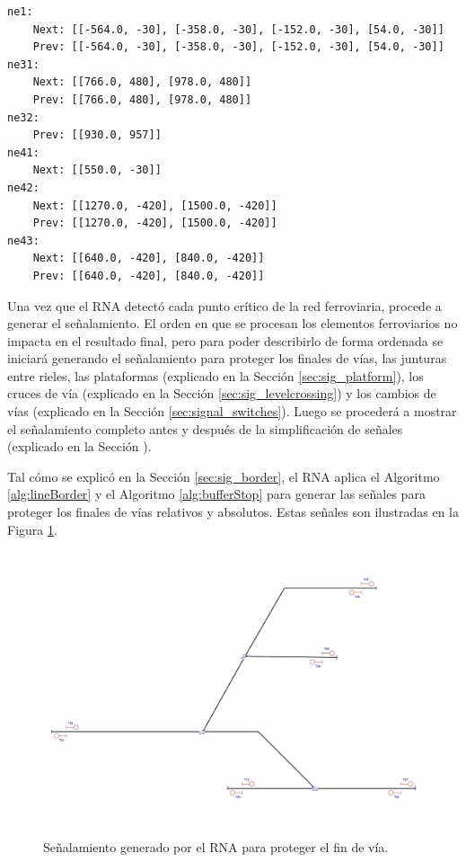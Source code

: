 	\begin{lstlisting}[language = {}, caption = SafePoints.RNA, label = {lst:EJ7_5}]
ne1:
	Next: [[-564.0, -30], [-358.0, -30], [-152.0, -30], [54.0, -30]]
	Prev: [[-564.0, -30], [-358.0, -30], [-152.0, -30], [54.0, -30]]
ne31:
	Next: [[766.0, 480], [978.0, 480]]
	Prev: [[766.0, 480], [978.0, 480]]
ne32:
	Prev: [[930.0, 957]]
ne41:
	Next: [[550.0, -30]]
ne42:
	Next: [[1270.0, -420], [1500.0, -420]]
	Prev: [[1270.0, -420], [1500.0, -420]]
ne43:
	Next: [[640.0, -420], [840.0, -420]]
	Prev: [[640.0, -420], [840.0, -420]]
	\end{lstlisting}	
	
	Una vez que el RNA detectó cada punto crítico de la red ferroviaria, procede a generar el señalamiento. El orden en que se procesan los elementos ferroviarios no impacta en el resultado final, pero para poder describirlo de forma ordenada se iniciará generando el señalamiento para proteger los finales de vías, las junturas entre rieles, las plataformas (explicado en la Sección \ref{sec:sig_platform}), los cruces de vía (explicado en la Sección \ref{sec:sig_levelcrossing}) y los cambios de vías (explicado en la Sección \ref{sec:signal_switches}). Luego se procederá a mostrar el señalamiento completo antes y después de la simplificación de señales (explicado en la Sección \label{sec:simplificacion}). 
	
	Tal cómo se explicó en la Sección \ref{sec:sig_border}, el RNA aplica el Algoritmo \ref{alg:lineBorder} y el Algoritmo \ref{alg:bufferStop} para generar las señales para proteger los finales de vías relativos y absolutos. Estas señales son ilustradas en la Figura \ref{fig:EJ7_3}.
	
	\begin{figure}[H]
		\centering
		\includegraphics[width=1\textwidth]{resultados-obtenidos/ejemplo7/images/7_step1.png}
		\centering\caption{Señalamiento generado por el RNA para proteger el fin de vía.}
		\label{fig:EJ7_3}
	\end{figure}
	
